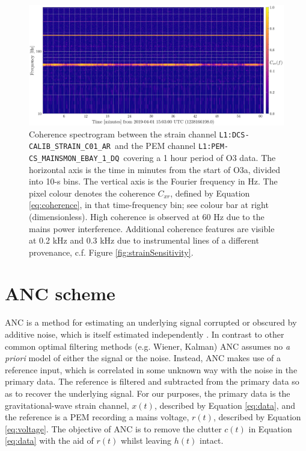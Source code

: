 \documentclass[pra,superscriptaddress,reprint,amsmath,amssymb,nofootinbib]{revtex4-2}
\newcommand{\StrainChanName}{\texttt{L1:DCS-CALIB\_STRAIN\_C01\_AR}}
\newcommand{\PEMChanName}{\texttt{L1:PEM-CS\_MAINSMON\_EBAY\_1\_DQ}}
\begin{document}
\begin{figure}
	\begin{center}
		\includegraphics[width=\textwidth]{images/coherence_spectrogram_canonical}
	\end{center}
	\caption{\label{correlation_1}
		Coherence spectrogram between the strain channel \StrainChanName  \, and the PEM channel \PEMChanName  	\, covering a 1 hour period of O3 data. The horizontal axis is the time in minutes from the start of O3a, divided into 10-s bins. The vertical axis is the Fourier frequency in Hz. The pixel colour denotes the coherence $C_{xr}$, defined by Equation \eqref{eq:coherence}, in that time-frequency bin; see colour bar at right (dimensionless). High coherence is observed at 60 Hz due to the mains power interference. Additional coherence features are visible at 0.2 kHz and 0.3 kHz due to instrumental lines of a different provenance, c.f. Figure \ref{fig:strainSensitivity}.}
\end{figure}



\section{ANC scheme}\label{sec:method}

ANC is a method for estimating an underlying signal corrupted or obscured by additive noise, which is itself estimated independently \cite{Widrow1451965}. In contrast to other common optimal filtering methods (e.g. Wiener, Kalman) ANC assumes no \textit{a priori} model of either the signal or the noise. Instead, ANC makes use of a reference input, which is correlated in some unknown way with the noise in the primary data. The reference is filtered and subtracted from the primary data so as to recover the underlying signal. For our purposes, the primary data is the gravitational-wave strain channel, $x(t)$, described by Equation \eqref{eq:data}, and the reference is a PEM recording a mains voltage, $r(t)$, described by Equation \eqref{eq:voltage}. The objective of ANC is to remove the clutter $c(t)$ in Equation \eqref{eq:data} with the aid of $r(t)$ whilst leaving $h(t)$ intact. \newline 
\end{document}
